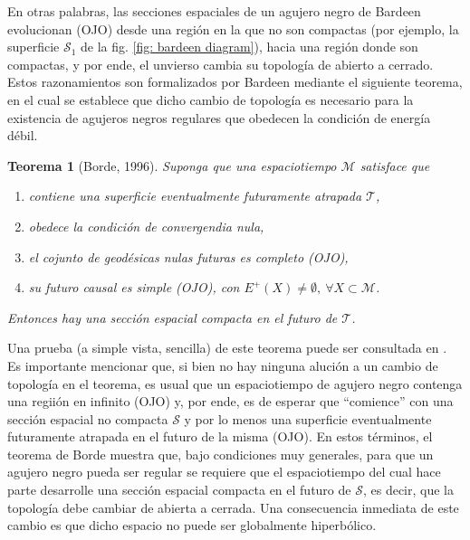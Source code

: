 \documentclass{article}
\numberwithin{equation}{section}
\newtheorem{theorem}{Teorema}[section]
\theoremstyle{definition}
\begin{document}
En otras palabras, las secciones espaciales de un agujero negro de Bardeen evolucionan (OJO) desde una región en la que no son compactas (por ejemplo, la superficie $\mathcal{S}_{1}$ de la fig. \ref{fig: bardeen diagram}), hacia una región donde son compactas, y por ende, el unvierso cambia su topología de abierto a cerrado. Estos razonamientos son formalizados por Bardeen mediante el siguiente teorema, en el cual se establece que dicho cambio de topología es necesario para la existencia de agujeros negros regulares que obedecen la condición de energía débil.

\begin{theorem}[Borde, 1996]
	\label{borde reg thm}
	Suponga que una espaciotiempo $\mathcal{M}$ satisface que
	
	\begin{enumerate}[i]
		\item contiene una superficie eventualmente futuramente atrapada $\mathcal{T}$,
		
		\item obedece la condición de convergendia nula,
		
		\item el cojunto de geodésicas nulas futuras es completo (OJO),
		
		\item su futuro causal es simple (OJO), con $E^{+}(X) \neq \emptyset,\ \forall X \subset \mathcal{M}$.
	\end{enumerate}
	
	Entonces hay una sección espacial compacta en el futuro de $\mathcal{T}$.
\end{theorem}

Una prueba (a simple vista, sencilla) de este teorema puede ser consultada en \cite{borde1996}.\\

Es importante mencionar que, si bien no hay ninguna alución a un cambio de topología en el teorema, es usual que un espaciotiempo de agujero negro contenga una regiión en infinito (OJO) y, por ende, es de esperar que ``comience'' con una sección espacial no compacta $\mathcal{S}$ y por lo menos una superficie eventualmente futuramente atrapada en el futuro de la misma (OJO). En estos términos, el teorema de Borde muestra que, bajo condiciones muy generales, para que un agujero negro pueda ser regular se requiere que el espaciotiempo del cual hace parte desarrolle una sección espacial compacta en el futuro de $\mathcal{S}$, es decir, que la topología debe cambiar de abierta a cerrada. Una consecuencia inmediata de este cambio es que dicho espacio no puede ser globalmente hiperbólico.\\
\end{document}
